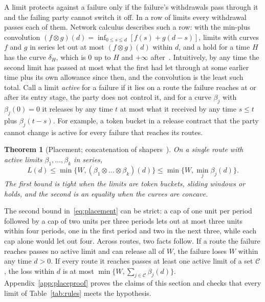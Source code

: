 \documentclass[conference,compsoc]{IEEEtran}
\numberwithin{equation}{section}
\theoremstyle{plain}
\newtheorem{theorem}{Theorem}[section]
\theoremstyle{definition}
\theoremstyle{remark}
\begin{document}
A limit protects against a failure only if the failure's withdrawals pass through it and the failing party cannot switch it off. In a row of limits every withdrawal passes each of them. Network calculus describes such a row: with the min-plus convolution $(f \otimes g)(d) = \inf_{0 \le s \le d} [f(s) + g(d-s)]$, limits with curves $f$ and $g$ in series let out at most $(f \otimes g)(d)$ within $d$, and a hold for a time $H$ has the curve $\delta_H$, which is $0$ up to $H$ and $+\infty$ after~\cite{leboudec2001}. Intuitively, by any time the second limit has passed at most what the first had let through at some earlier time plus its own allowance since then, and the convolution is the least such total. Call a limit \emph{active} for a failure if it lies on a route the failure reaches at or after its entry stage, the party does not control it, and for a curve $\beta_j$ with $\beta_j(0) = 0$ it releases by any time $t$ at most what it received by any time $s \le t$ plus $\beta_j(t - s)$. For example, a token bucket in a release contract that the party cannot change is active for every failure that reaches its routes.

\begin{theorem}[Placement; concatenation of shapers~\cite{leboudec2001}]\label{thm:placement}
On a single route with active limits $\beta_1, \dots, \beta_k$ in series,
\begin{equation}\label{eq:placement}
L(d) \le \min\{W, (\beta_1 \otimes \dots \otimes \beta_k)(d)\} \le \min\{W, \min_j \beta_j(d)\}.
\end{equation}
The first bound is tight when the limits are token buckets, sliding windows or holds, and the second is an equality when the curves are concave.
\end{theorem}

The second bound in~\eqref{eq:placement} can be strict: a cap of one unit per period followed by a cap of two units per three periods lets out at most three units within four periods, one in the first period and two in the next three, while each cap alone would let out four. Across routes, two facts follow. If a route the failure reaches passes no active limit and can release all of $W$, the failure loses $W$ within any time $d > 0$. If every route it reaches passes at least one active limit of a set $\mathcal{C}$, the loss within $d$ is at most $\min\{W, \sum_{j \in \mathcal{C}} \beta_j(d)\}$. Appendix~\ref{app:placeproof} proves the claims of this section and checks that every limit of Table~\ref{tab:rules} meets the hypothesis.
\end{document}
